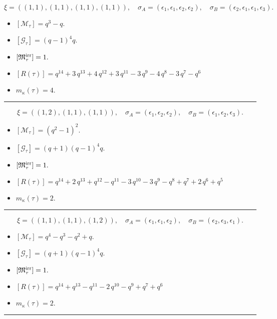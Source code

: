 \documentclass[10pt,a4paper]{amsart}
\begin{document}
$$\xi = ({(1, 1), (1, 1), (1, 1)}, {(1, 1)}),\quad \sigma_A = ({{\epsilon_1}, {\epsilon_1}, {\epsilon_2}}, {{\epsilon_2}}),\quad \sigma_B = ({{\epsilon_2}, {\epsilon_1}, {\epsilon_1}}, {{\epsilon_3}}).$$

\begin{itemize}
 \item $[\mathcal{M}_{\tau}] = q^{3} - q .$

 \item $[\mathcal{G}_{\tau}] = {\left(q - 1\right)}^{4} q .$

 \item $[{\frak M}_{\tau}^{\textrm{irr}}] = 1 .$

 \item $[R(\tau)] = q^{14} + 3 \, q^{13} + 4 \, q^{12} + 3 \, q^{11} - 3 \, q^{9} - 4 \, q^{8} - 3 \, q^{7} - q^{6} $

 \item $m_{\kappa}(\tau) = 4 .$

 \end{itemize}
\noindent\rule{8cm}{0.4pt}

$$\xi = ({(1, 2)}, {(1, 1), (1, 1)}),\quad \sigma_A = ({{\epsilon_1}}, {{\epsilon_2}, {\epsilon_2}}),\quad \sigma_B = ({{\epsilon_1}}, {{\epsilon_2}, {\epsilon_3}}).$$

\begin{itemize}
 \item $[\mathcal{M}_{\tau}] = {\left(q^{2} - 1\right)}^{2} .$

 \item $[\mathcal{G}_{\tau}] = {\left(q + 1\right)} {\left(q - 1\right)}^{4} q .$

 \item $[{\frak M}_{\tau}^{\textrm{irr}}] = 1 .$

 \item $[R(\tau)] = q^{14} + 2 \, q^{13} + q^{12} - q^{11} - 3 \, q^{10} - 3 \, q^{9} - q^{8} + q^{7} + 2 \, q^{6} + q^{5} $

 \item $m_{\kappa}(\tau) = 2 .$

 \end{itemize}
\noindent\rule{8cm}{0.4pt}

$$\xi = ({(1, 1), (1, 1)}, {(1, 2)}),\quad \sigma_A = ({{\epsilon_1}, {\epsilon_1}}, {{\epsilon_2}}),\quad \sigma_B = ({{\epsilon_2}, {\epsilon_3}}, {{\epsilon_1}}).$$

\begin{itemize}
 \item $[\mathcal{M}_{\tau}] = q^{4} - q^{3} - q^{2} + q .$

 \item $[\mathcal{G}_{\tau}] = {\left(q + 1\right)} {\left(q - 1\right)}^{4} q .$

 \item $[{\frak M}_{\tau}^{\textrm{irr}}] = 1 .$

 \item $[R(\tau)] = q^{14} + q^{13} - q^{11} - 2 \, q^{10} - q^{9} + q^{7} + q^{6} $

 \item $m_{\kappa}(\tau) = 2 .$

 \end{itemize}
\noindent\rule{8cm}{0.4pt}
\end{document}
